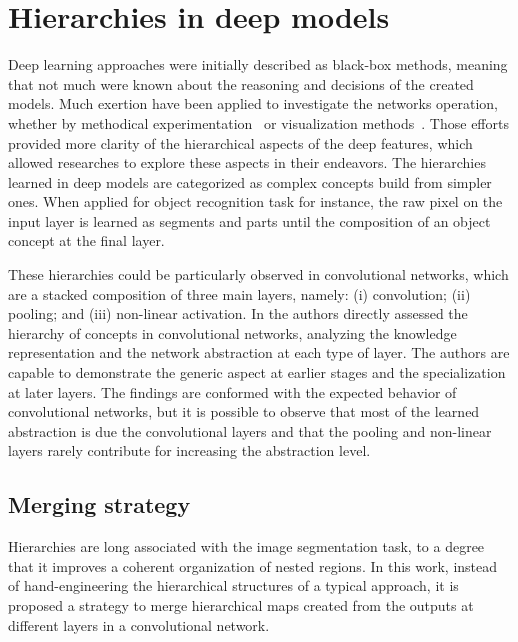 



\section{Hierarchies in deep models}
\label{sec:method}


Deep learning approaches were initially described as black-box methods, meaning that not much were known about the reasoning and decisions of the created models. Much exertion have been applied to investigate the networks operation, whether by methodical experimentation~\cite{ilin17,kuo16,eigen14,zhang17} or visualization methods~\cite{simonyan13,zeiler14}. Those efforts provided more clarity of the hierarchical aspects of the deep features, which allowed researches to explore these aspects in their endeavors. The  hierarchies learned in deep models are categorized as complex concepts build from simpler ones. When applied for object recognition task for instance, the raw pixel on the input layer is learned as segments and parts until the composition of an object concept at the final layer.  

These hierarchies could be particularly observed in convolutional networks, which are a stacked composition of three main layers, namely: (i) convolution; (ii) pooling; and (iii) non-linear activation. In \cite{ilin17} the authors directly assessed the hierarchy of concepts in convolutional networks, analyzing the knowledge representation and the network abstraction at each type of layer.  The authors are capable to demonstrate the generic aspect at earlier stages and the specialization at later layers. The findings are conformed with the expected behavior of convolutional networks, but it is possible to observe that most of the learned abstraction is due the convolutional layers and that the pooling and non-linear layers rarely contribute for increasing  the abstraction level.



\subsection{Merging strategy}

Hierarchies are long associated with the image segmentation task, to a degree that it improves a coherent organization of nested regions. In this work, instead of hand-engineering the hierarchical structures of a typical approach, it is proposed a strategy to merge hierarchical maps created from the outputs at different layers in a convolutional network. 

